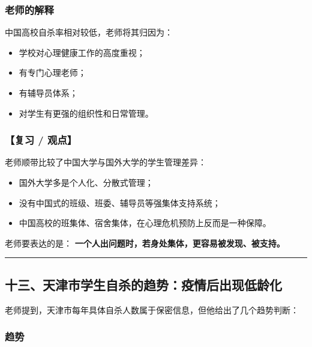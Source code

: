 \documentclass[
  chinese,
  9pt,
  a4paper,
]{ctexart}
\providecommand{\tightlist}{%
  \setlength{\itemsep}{0pt}\setlength{\parskip}{0pt}}
\begin{document}
\subsubsection{老师的解释}\label{ux8001ux5e08ux7684ux89e3ux91ca-1}

中国高校自杀率相对较低，老师将其归因为：

\begin{itemize}
\tightlist
\item
  学校对心理健康工作的高度重视；
\item
  有专门心理老师；
\item
  有辅导员体系；
\item
  对学生有更强的组织性和日常管理。
\end{itemize}

\subsubsection{【复习 / 观点】}\label{ux590dux4e60-ux89c2ux70b9}

老师顺带比较了中国大学与国外大学的学生管理差异：

\begin{itemize}
\tightlist
\item
  国外大学多是个人化、分散式管理；
\item
  没有中国式的班级、班委、辅导员等强集体支持系统；
\item
  中国高校的班集体、宿舍集体，在心理危机预防上反而是一种保障。
\end{itemize}

老师要表达的是：
\textbf{一个人出问题时，若身处集体，更容易被发现、被支持。}

\begin{center}\rule{0.5\linewidth}{0.5pt}\end{center}

\subsection{十三、天津市学生自杀的趋势：疫情后出现低龄化}\label{ux5341ux4e09ux5929ux6d25ux5e02ux5b66ux751fux81eaux6740ux7684ux8d8bux52bfux75abux60c5ux540eux51faux73b0ux4f4eux9f84ux5316}

老师提到，天津市每年具体自杀人数属于保密信息，但他给出了几个趋势判断：

\subsubsection{趋势}\label{ux8d8bux52bf}
\end{document}
